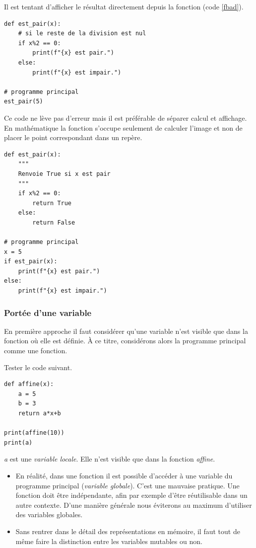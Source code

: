 \documentclass[a4paper,11pt]{article}
\begin{document}
\begin{Form}
\begin{aretenir}
Il est tentant d'afficher le résultat directement depuis la fonction (code \ref{fbad}).
\begin{center}
\begin{lstlisting}
def est_pair(x):
	# si le reste de la division est nul
	if x%2 == 0:
		print(f"{x} est pair.")
	else:
		print(f"{x} est impair.")

# programme principal
est_pair(5)
\end{lstlisting}
\label{fbad}
\end{center}

Ce code ne lève pas d'erreur mais il est préférable de séparer calcul et affichage. En mathématique la fonction s'occupe seulement de calculer l'image et non de placer le point correspondant dans un repère.
\begin{center}
\begin{lstlisting}
def est_pair(x):
	"""
	Renvoie True si x est pair
	"""
	if x%2 == 0:
		return True
	else:
		return False

# programme principal
x = 5
if est_pair(x):
	print(f"{x} est pair.")
else:
	print(f"{x} est impair.")
\end{lstlisting}
\label{moncode}
\end{center}
\end{aretenir}
\subsubsection{Portée d'une variable}
En première approche il faut considérer qu'une variable n'est visible que dans la fonction où elle est définie. À ce titre, considérons alors la programme principal comme une fonction.
\begin{activite}
Tester le code suivant.
\begin{center}
\begin{lstlisting}
def affine(x):
	a = 5
	b = 3
	return a*x+b

print(affine(10))
print(a)
\end{lstlisting}
\label{moncode}
\end{center}

\emph{a} est une \emph{variable locale}. Elle n'est visible que dans la fonction \emph{affine}.
\end{activite}
\begin{aretenir}
\begin{itemize}
\item En réalité, dans une fonction il est possible d'accéder à une variable du programme principal (\emph{variable globale}). C'est une mauvaise pratique. Une fonction doit être indépendante, afin par exemple d'être réutilisable dans un autre contexte. D'une manière générale nous éviterons au maximum d'utiliser des variables globales.
\item Sans rentrer dans le détail des représentations en mémoire, il faut tout de même faire la distinction entre les variables mutables ou non.


\end{itemize}
\end{aretenir}
\end{Form}
\end{document}
